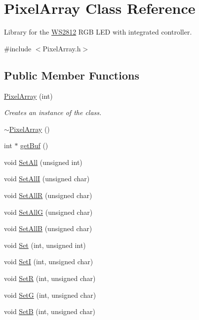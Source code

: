\hypertarget{class_pixel_array}{}\section{Pixel\+Array Class Reference}
\label{class_pixel_array}


Library for the \hyperlink{class_w_s2812}{W\+S2812} R\+GB L\+ED with integrated controller.  




{\ttfamily \#include $<$Pixel\+Array.\+h$>$}

\subsection*{Public Member Functions}
\begin{DoxyCompactItemize}
\item 
\hyperlink{class_pixel_array_a86359f5eda90e0d12e3aa2c102ade21d}{Pixel\+Array} (int)
\begin{DoxyCompactList}\small\item\em Creates an instance of the class. \end{DoxyCompactList}\item 
\hyperlink{class_pixel_array_a9f4d10fcbd08290dfdecafb2ed4ad687}{$\sim$\+Pixel\+Array} ()
\item 
int $\ast$ \hyperlink{class_pixel_array_a987f1dc053a5cf25d78d5cfe037088d3}{get\+Buf} ()
\item 
void \hyperlink{class_pixel_array_a5f560dcef3d1582614858969b20da89d}{Set\+All} (unsigned int)
\item 
void \hyperlink{class_pixel_array_a9433e281c3cc0e4f8bbf23e127d8ad2c}{Set\+AllI} (unsigned char)
\item 
void \hyperlink{class_pixel_array_a9ddfdd1a01a9877e4bfcf5a462412fd2}{Set\+AllR} (unsigned char)
\item 
void \hyperlink{class_pixel_array_a88f25ee1b266e2dc0ef7ae90ff4bd12d}{Set\+AllG} (unsigned char)
\item 
void \hyperlink{class_pixel_array_a3b17271fdc21503236ca6ca8e37d501b}{Set\+AllB} (unsigned char)
\item 
void \hyperlink{class_pixel_array_afcfe32b74beeced27f928f42131d77c1}{Set} (int, unsigned int)
\item 
void \hyperlink{class_pixel_array_afbfac74c674f63d793d85141d3a3b046}{SetI} (int, unsigned char)
\item 
void \hyperlink{class_pixel_array_abd4253e7c76f3775f31e09dfe318e3a5}{SetR} (int, unsigned char)
\item 
void \hyperlink{class_pixel_array_a60ea8084ec95df0d51f46c9b0ff308d5}{SetG} (int, unsigned char)
\item 
void \hyperlink{class_pixel_array_a560a654c59614fd5a6c17adb10083a78}{SetB} (int, unsigned char)
\end{DoxyCompactItemize}

